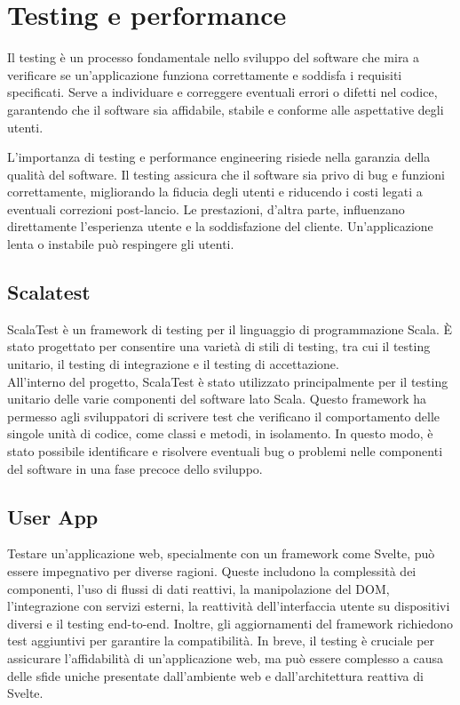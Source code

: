 
\section{Testing e performance}

Il testing è un processo fondamentale nello sviluppo del software che mira a verificare se un'applicazione
funziona correttamente e soddisfa i requisiti specificati. Serve a individuare e correggere eventuali
errori o difetti nel codice, garantendo che il software sia affidabile, stabile e conforme alle aspettative degli utenti.

L'importanza di testing e performance engineering risiede nella garanzia della qualità del software.
Il testing assicura che il software sia privo di bug e funzioni correttamente, migliorando la fiducia
degli utenti e riducendo i costi legati a eventuali correzioni post-lancio. Le prestazioni,
d'altra parte, influenzano direttamente l'esperienza utente e la soddisfazione del cliente.
Un'applicazione lenta o instabile può respingere gli utenti.

\subsection{Scalatest}
ScalaTest è un framework di testing per il linguaggio di programmazione Scala.
È stato progettato per consentire una varietà di stili di testing, tra cui il testing unitario,
il testing di integrazione e il testing di accettazione.\\

All'interno del progetto, ScalaTest è stato utilizzato principalmente per il testing
unitario delle varie componenti del software lato Scala. Questo framework ha permesso agli
sviluppatori di scrivere test che verificano il comportamento delle singole unità di codice,
come classi e metodi, in isolamento. In questo modo, è stato possibile identificare e risolvere
eventuali bug o problemi nelle componenti del software in una fase precoce dello sviluppo.

\subsection{User App}
Testare un'applicazione web, specialmente con un framework come Svelte, può essere
impegnativo per diverse ragioni. Queste includono la complessità dei componenti,
l'uso di flussi di dati reattivi, la manipolazione del DOM, l'integrazione con servizi
esterni, la reattività dell'interfaccia utente su dispositivi diversi e il testing end-to-end.
Inoltre, gli aggiornamenti del framework richiedono test aggiuntivi per garantire la compatibilità.
In breve, il testing è cruciale per assicurare l'affidabilità di un'applicazione web, ma può essere
complesso a causa delle sfide uniche presentate dall'ambiente web e dall'architettura reattiva di Svelte.

